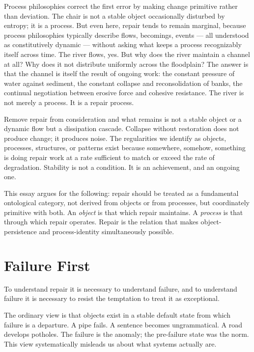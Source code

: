 \documentclass[11pt, a4paper]{article}
\theoremstyle{definition}
\theoremstyle{remark}
\begin{document}
Process philosophies correct the first error by making change primitive rather
than deviation. The chair is not a stable object occasionally disturbed by
entropy; it is a process. But even here, repair tends to remain marginal,
because process philosophies typically describe flows, becomings, events --- all
understood as constitutively dynamic --- without asking what keeps a process
recognizably itself across time. The river flows, yes. But why does the river
maintain a channel at all? Why does it not distribute uniformly across the
floodplain? The answer is that the channel is itself the result of ongoing work:
the constant pressure of water against sediment, the constant collapse and
reconsolidation of banks, the continual negotiation between erosive force and
cohesive resistance. The river is not merely a process. It is a repair process.

Remove repair from consideration and what remains is not a stable object or a
dynamic flow but a dissipation cascade. Collapse without restoration does not
produce change; it produces noise. The regularities we identify as objects,
processes, structures, or patterns exist because somewhere, somehow, something
is doing repair work at a rate sufficient to match or exceed the rate of
degradation. Stability is not a condition. It is an achievement, and an ongoing
one.

This essay argues for the following: repair should be treated as a fundamental
ontological category, not derived from objects or from processes, but
coordinately primitive with both. An \textit{object} is that which repair
maintains. A \textit{process} is that through which repair operates. Repair
is the relation that makes object-persistence and process-identity
simultaneously possible.

\section{Failure First}

To understand repair it is necessary to understand failure, and to understand
failure it is necessary to resist the temptation to treat it as exceptional.

The ordinary view is that objects exist in a stable default state from which
failure is a departure. A pipe fails. A sentence becomes ungrammatical. A road
develops potholes. The failure is the anomaly; the pre-failure state was the
norm. This view systematically misleads us about what systems actually are.
\end{document}

